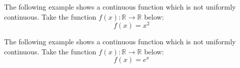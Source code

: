 \begin{example}
  The following example shows a continuous function which is not uniformly continuous.
  Take the function $f(x):\mathbb{R}\rightarrow\mathbb{R}$ below:
  \begin{equation*}
    f(x)=x^{2}
  \end{equation*}
\end{example}

\begin{example}
  The following example shows a continuous function which is not uniformly continuous.
  Take the function $f(x):\mathbb{R}\rightarrow\mathbb{R}$ below:
  \begin{equation*}
    f(x)=e^{x}
  \end{equation*}
\end{example}
